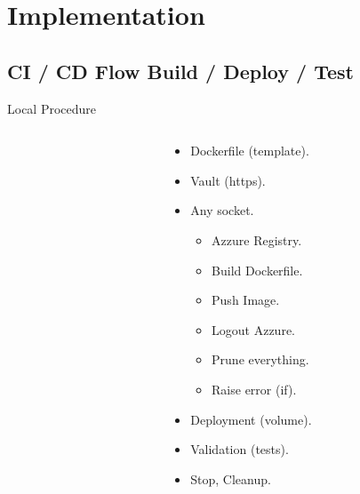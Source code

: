 \section{Implementation} \label{sec:implementation}
\subsection{CI / CD Flow Build / Deploy / Test}

\begin{frame}{Local Procedure}
	\begin{columns}[T] %
		\begin{column}{5cm} %
		\end{column}
		\begin{column}{5cm} %
			\begin{itemize}
				\item<+-| alert@+> Dockerfile (template).
				\item<+-| alert@+> Vault (https).
				\item<+-| alert@+> Any socket.
					\begin{itemize}
						\item<+-| alert@+> Azzure Registry.
						\item<+-| alert@+> Build Dockerfile.
						\item<+-| alert@+> Push Image.
						\item<+-| alert@+> Logout Azzure.
						\item<+-| alert@+> Prune everything.
						\item<+-| alert@+> Raise error (if).
					\end{itemize}
				\item<+-| alert@+> Deployment (volume).
				\item<+-| alert@+> Validation (tests).
				\item<+-| alert@+> Stop, Cleanup.
			\end{itemize}
		\end{column}
	\end{columns}
\end{frame}

